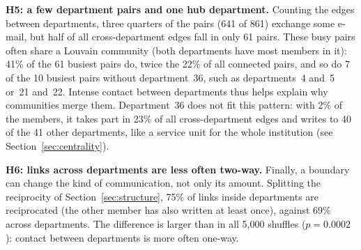 \textbf{H5: a few department pairs and one hub department.} Counting the edges
between departments, three quarters of the pairs (641 of 861) exchange some e-mail, but
half of all cross-department edges fall in only 61 pairs. These busy pairs
often share a Louvain community (both departments have most members in it): 41\%
of the 61 busiest pairs do, twice the 22\% of all connected pairs, and so do 7
of the 10 busiest pairs without department~36, such as departments~4 and~5 or~21
and~22. Intense contact between departments thus helps explain why communities
merge them. Department~36 does not fit this pattern: with 2\% of the members, it takes part in 23\% of all
cross-department edges and writes to 40 of the 41 other departments, like a
service unit for the whole institution (see Section~\ref{sec:centrality}).

\textbf{H6: links across departments are less often two-way.} Finally, a
boundary can change the kind of communication, not only its amount. Splitting
the reciprocity of Section~\ref{sec:structure}, 75\% of links inside
departments are reciprocated (the other member has also written at least once),
against 69\% across departments. The difference is
larger than in all 5{,}000 shuffles ($p=0.0002$): contact between departments is
more often one-way.

